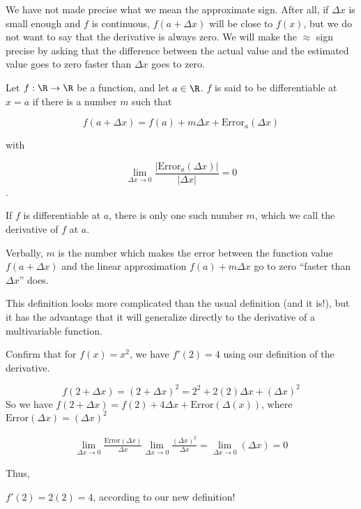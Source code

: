 \documentclass{ximera}
\begin{document}
We have not made precise what we mean the approximate sign.  After all, if $\Delta x$ is small enough and $f$ is continuous, 
$f(a+\Delta x)$ will be close to $f(x)$, but we do not want to say that the derivative is always zero.  We will make the  $\approx$ sign precise by asking that the difference 
between the actual value and the estimated value goes to zero faster than $\Delta x$ goes to zero.

\begin{definition}
  Let $f: \R \to \R$ be a function, and let $a \in \R$.  $f$ is said to be differentiable at $x=a$ if there is a number $m$ such that 
  
  \[ f(a+\Delta x) = f(a) + m\Delta x + \text{Error}_a(\Delta x)\]
  
  with
  
  \[ \lim_{\Delta x \to 0} \frac{\left|\text{Error}_a(\Delta x)\right|}{\left|\Delta x\right|} = 0 \].
  
  If $f$ is differentiable at $a$, there is only one such number $m$, which we call the derivative of $f$ at $a$.  
  
  Verbally,  $m$ is the number which makes the error between the function value $f(a+\Delta x)$ and the linear approximation $f(a)+m\Delta x$ go to zero 
  ``faster than $\Delta x$'' does.
\end{definition}

This definition looks more complicated than the usual definition (and it is!), but it has the advantage that it will 
generalize directly to the derivative of a multivariable function.
	

Confirm that for $f(x)=x^2$, we have $f'(2)=4$ using our definition of the derivative.
	
\begin{free-response}
  \[
  f(2+\Delta x) = (2+\Delta x)^2 = 2^2+2(2)\Delta x + (\Delta x)^2
  \]
  So we have $f(2+\Delta x) = f(2)+4\Delta x + \text{Error}(\Delta(x))$, where $\text{Error}(\Delta x) = (\Delta x)^2$
  
  \begin{align*}
    \lim_{\Delta x \to 0} \frac{\text{Error}(\Delta x)}{\Delta x}
    \lim_{\Delta x \to 0} \frac{(\Delta x)^2}{\Delta x} 
    = \lim_{\Delta x \to 0} \left(\Delta x  \right)
    = 0
  \end{align*}
  
  Thus, 
  
  $f'(2) = 2(2) =4$, according to our new definition!
\end{free-response}
\end{document}
